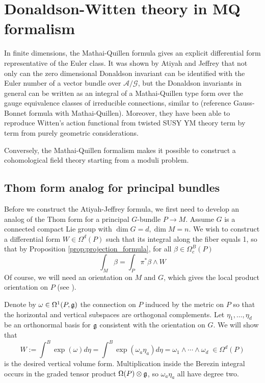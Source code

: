 \chapter{Donaldson-Witten theory in MQ formalism}
\label{chapter4}
In finite dimensions, the Mathai-Quillen formula gives an explicit differential
form representative of the Euler class. 
It was shown by Atiyah and
Jeffrey \cite{atiyahlagrangians} that not only can the zero dimensional
Donaldson invariant can be identified with the Euler number of a vector bundle
over $\mathcal{A} /\mathcal{G}$, but the Donaldson invariants in general can be
written as an integral of a Mathai-Quillen type form over the gauge equivalence
classes of irreducible connections, similar to (reference Gauss-Bonnet formula
with Mathai-Quillen).
Moreover, they have been able to reproduce Witten's
action functional from twisted SUSY YM theory term by term from purely geometric
considerations.

Conversely,
the Mathai-Quillen formalism makes it possible to construct a cohomological field
theory starting from a moduli problem.

\section{Thom form analog for principal bundles}
Before we construct the Atiyah-Jeffrey formula, we first need to develop an
analog of the Thom form for a principal $G$-bundle $P\to M$. Assume $G$ is
a connected compact Lie group with $\dim G = d, \dim M = n$. 
We wish to construct a differential form  $W\in \Omega^d(P)$
such that its integral along the fiber equals 1, so that by 
Proposition \ref{prop:projection_formula}, for all $\beta\in \Omega_c^B(P)$
\begin{equation} \label{eq:principal_thom_local}
	\int_M \beta = \int_P \pi^*\beta \wedge W
\end{equation}
Of course, we will need an orientation on $M$ and $G$, which gives the local
product orientation on $P$ (see \cite[p.64]{bott_tu}).   

Denote by $\omega \in \Omega^1(P,\operatorname{\mathfrak{g}})$ the connection on
$P$ induced by the metric on $P$ so that the horizontal and
vertical subspaces are orthogonal complements. Let $\eta_1,\ldots,\eta_d$ be an 
orthonormal basis for $\operatorname{\mathfrak{g}}$ consistent with the orientation on $G$.
We will show that
\begin{equation} \label{eq:principal_thom}
W := \int^B \exp(\omega) d\eta 
= \int^B \exp(\omega_a\eta_a) d\eta = \omega_1 \wedge \cdots \wedge\omega_d
\;\in \Omega^d(P)
\end{equation}
is the desired vertical volume form. Multiplication inside the Berezin
integral occurs in the graded tensor product $\Omega(P)\otimes \operatorname{\mathfrak{g}}$, 
so $\omega_a\eta_a$ all have degree two.

